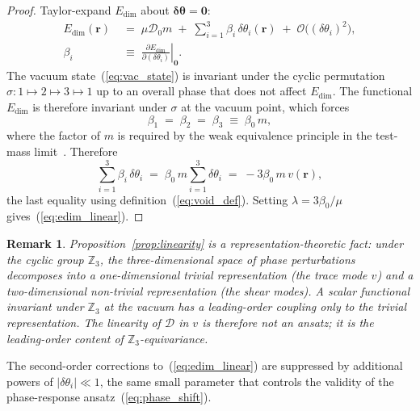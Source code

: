 \documentclass[pdflatex,sn-mathphys-num]{sn-jnl}%
\theoremstyle{thmstyleone}%
\theoremstyle{thmstyletwo}%
\newtheorem{remark}{Remark}%
\theoremstyle{thmstylethree}%
\begin{document}
\begin{proof}
Taylor-expand $E_{\mathrm{dim}}$ about $\boldsymbol{\delta\theta}
=\mathbf{0}$:
\begin{equation}
\begin{split}
    E_{\mathrm{dim}}(\mathbf{r})
    &\;=\;
    \mu\mathcal{D}_0 m
    \;+\;
    \sum_{i=1}^{3}
    \beta_i\,\delta\theta_i(\mathbf{r})
    \;+\;
    \mathcal{O}\!\bigl((\delta\theta_i)^2\bigr), \\
    \beta_i
    &\;\equiv\;
    \left.\frac{\partial E_{\mathrm{dim}}}
    {\partial(\delta\theta_i)}\right|_{\mathbf{0}}.
\end{split}
\end{equation}
The vacuum state~(\ref{eq:vac_state}) is invariant under the
cyclic permutation $\sigma\colon 1\mapsto 2\mapsto 3\mapsto 1$
up to an overall phase that does not affect $E_{\mathrm{dim}}$.
The functional $E_{\mathrm{dim}}$ is therefore invariant under
$\sigma$ at the vacuum point, which forces
\begin{equation}
    \beta_1 \;=\; \beta_2 \;=\; \beta_3
    \;\equiv\; \beta_0\,m,
\end{equation}
where the factor of $m$ is required by the weak equivalence
principle in the test-mass limit~\cite{Will2014}. Therefore
\begin{equation}
    \sum_{i=1}^{3}\beta_i\,\delta\theta_i
    \;=\;
    \beta_0\,m\sum_{i=1}^{3}\delta\theta_i
    \;=\;
    -3\beta_0\,m\,v(\mathbf{r}),
\end{equation}
the last equality using definition~(\ref{eq:void_def}). Setting
$\lambda=3\beta_0/\mu$ gives~(\ref{eq:edim_linear}).
\end{proof}

\begin{remark}
\label{rem:rep_theory}
Proposition~\ref{prop:linearity} is a representation-theoretic
fact: under the cyclic group $\mathbb{Z}_3$, the
three-dimensional space of phase perturbations decomposes into
a one-dimensional trivial representation (the trace mode $v$)
and a two-dimensional non-trivial representation (the shear
modes). A scalar functional invariant under $\mathbb{Z}_3$ at
the vacuum has a leading-order coupling only to the trivial
representation. The linearity of $\mathcal{D}$ in $v$ is
therefore not an ansatz; it is the leading-order content of
$\mathbb{Z}_3$-equivariance.
\end{remark}

The second-order corrections to~(\ref{eq:edim_linear}) are
suppressed by additional powers of $|\delta\theta_i|\ll 1$, the
same small parameter that controls the validity of the
phase-response ansatz~(\ref{eq:phase_shift}).
\end{document}
